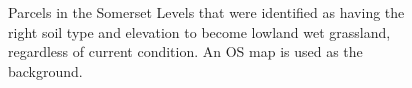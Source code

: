 \documentclass[
  12pt,
  letterpaper,
  DIV=11,
  numbers=noendperiod]{scrartcl}
\begin{document}
\begin{figure}[H]


\caption{\label{fig-SomSuitHab}Parcels in the Somerset Levels that were
identified as having the right soil type and elevation to become lowland
wet grassland, regardless of current condition. An OS map is used as the
background.}

\end{figure}%
\end{document}
